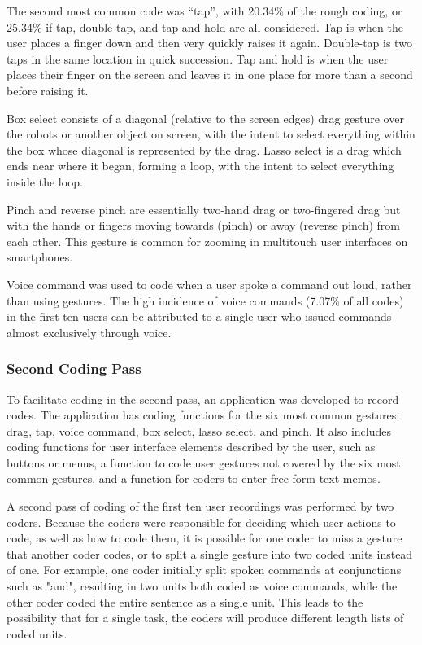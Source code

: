 The second most common code was ``tap'', with 20.34\% of the rough coding, or 25.34\% if tap, double-tap, and tap and hold are all considered. Tap is when the user places a finger down and then very quickly raises it again. Double-tap is two taps in the same location in quick succession. Tap and hold is when the user places their finger on the screen and leaves it in one place for more than a second before raising it. 

Box select consists of a diagonal (relative to the screen edges) drag gesture over the robots or another object on screen, with the intent to select everything within the box whose diagonal is represented by the drag. 
Lasso select is a drag which ends near where it began, forming a loop, with the intent to select everything inside the loop. 

Pinch and reverse pinch are essentially two-hand drag or two-fingered drag but with the hands or fingers moving towards (pinch) or away (reverse pinch) from each other.
This gesture is common for zooming in multitouch user interfaces on smartphones. 

Voice command was used to code when a user spoke a command out loud, rather than using gestures. The high incidence of voice commands (7.07\% of all codes) in the first ten users can be attributed to a single user who issued commands almost exclusively through voice. 
 
\subsubsection{Second Coding Pass} \label{section:Second_Coding_Pass}

To facilitate coding in the second pass, an application was developed to record codes. 
The application has coding functions for the six most common gestures: drag, tap, voice command, box select, lasso select, and pinch. 
It also includes coding functions for user interface elements described by the user, such as buttons or menus, a function to code user gestures not covered by the six most common gestures, and a function for coders to enter free-form text memos. 


A second pass of coding of the first ten user recordings was performed by two coders. 
Because the coders were responsible for deciding which user actions to code, as well as how to code them, it is possible for one coder to miss a gesture that another coder codes, or to split a single gesture into two coded units instead of one. 
For example, one coder initially split spoken commands at conjunctions such as "and", resulting in two units both coded as voice commands, while the other coder coded the entire sentence as a single unit. 
This leads to the possibility that for a single task, the coders will produce different length lists of coded units. 

